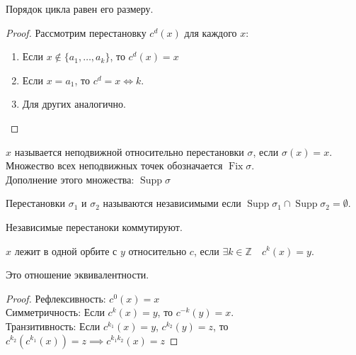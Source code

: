\documentclass[11pt, oneside]{article}   	%
\DeclareMathOperator{\fix}{Fix}
\DeclareMathOperator{\supp}{Supp}
\begin{document}
    \begin{theorem}
        Порядок цикла равен его размеру.
        \begin{proof}
            Рассмотрим перестановку $c^{d}(x)$ для каждого $x$:
            \begin{enumerate}
                \item Если $x \not\in \{a_1, \ldots, a_k\} $, то $c^{d}(x)=x$ 
                \item Если $x=a_1$, то $c^{d} = x \iff k$.
                \item Для других аналогично.
            \end{enumerate}
        \end{proof}
    \end{theorem}
    \begin{definition}
        $x$  называется неподвижной относительно перестановки $\sigma$, если $\sigma(x) = x$.\\
        Множество всех неподвижных точек обозначается $\fix\sigma$.\\
        Дополнение этого множества: $\supp\sigma$
    \end{definition}
    \begin{definition}
        Перестановки $\sigma_1$ и $\sigma_2$ называются независимыми если $\supp \sigma_1\cap \supp \sigma_2 = \emptyset$.
    \end{definition}
    \begin{dlemma}
        Независимые перестаноки коммутируют.
    \end{dlemma}
    \begin{definition}
        $x$ лежит в одной орбите с $y$ относительно $c$, если $\exists{k\in \mathbb{Z}}\quad c^{k}(x) = y$.
    \end{definition}
    \begin{dlemma}
        Это отношение эквивалентности.\\
        \begin{proof}
            Рефлексивность: $c^{0}(x) = x$\\
            Симметричность: Если $c^{k}(x) = y$, то $c^{-k}(y) = x$.\\
            Транзитивность: Если $c^{k_1}(x) = y$, $c^{k_2}(y) = z$, то $c^{k_2}(c^{k_1}(x)) = z \implies c^{k_1k_2}(x) = z$  
        \end{proof}
    \end{dlemma}
\end{document}
